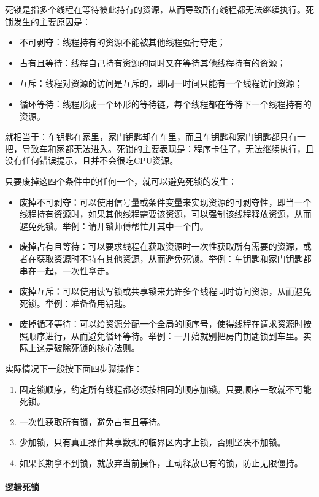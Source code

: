 死锁是指多个线程在等待彼此持有的资源，从而导致所有线程都无法继续执行。死锁发生的主要原因是：
\begin{itemize}
    \item 不可剥夺：线程持有的资源不能被其他线程强行夺走；
    \item 占有且等待：线程自己持有资源的同时又在等待其他线程持有的资源；
    \item 互斥：线程对资源的访问是互斥的，即同一时间只能有一个线程访问资源；
    \item 循环等待：线程形成一个环形的等待链，每个线程都在等待下一个线程持有的资源。
\end{itemize}
就相当于：车钥匙在家里，家门钥匙却在车里，而且车钥匙和家门钥匙都只有一把，导致车和家都无法进入。死锁的主要表现是：程序卡住了，无法继续执行，且没有任何错误提示，且并不会很吃CPU资源。

只要废掉这四个条件中的任何一个，就可以避免死锁的发生：
\begin{itemize}
    \item 废掉不可剥夺：可以使用信号量或条件变量来实现资源的可剥夺性，即当一个线程持有资源时，如果其他线程需要该资源，可以强制该线程释放资源，从而避免死锁。举例：请开锁师傅帮忙开其中一个门。
    \item 废掉占有且等待：可以要求线程在获取资源时一次性获取所有需要的资源，或者在获取资源时不持有其他资源，从而避免死锁。举例：车钥匙和家门钥匙都串在一起，一次性拿走。
    \item 废掉互斥：可以使用读写锁或共享锁来允许多个线程同时访问资源，从而避免死锁。举例：准备备用钥匙。
    \item 废掉循环等待：可以给资源分配一个全局的顺序号，使得线程在请求资源时按照顺序进行，从而避免循环等待。举例：一开始就别把房门钥匙锁到车里。实际上这是破除死锁的核心法则。
\end{itemize}

实际情况下一般按下面四步骤操作：
\begin{enumerate}
    \item 固定锁顺序，约定所有线程都必须按相同的顺序加锁。只要顺序一致就不可能死锁。
    \item 一次性获取所有锁，避免占有且等待。
    \item 少加锁，只有真正操作共享数据的临界区内才上锁，否则坚决不加锁。
    \item 如果长期拿不到锁，就放弃当前操作，主动释放已有的锁，防止无限僵持。
\end{enumerate}

\paragraph{逻辑死锁}

